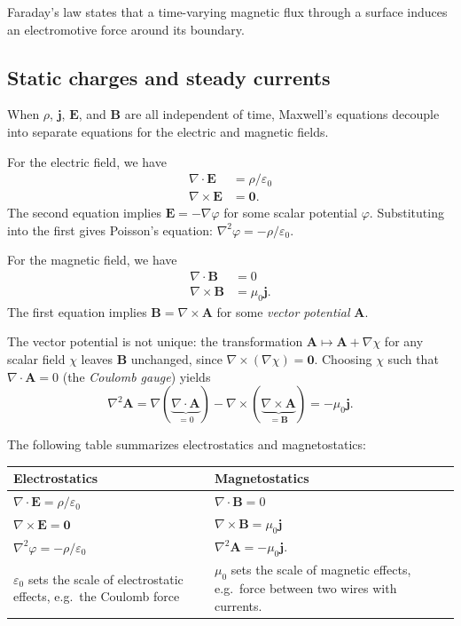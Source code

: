 \documentclass[a4paper]{article}
\begin{document}
\begin{rmk}
  Faraday's law states that a time-varying magnetic flux through a surface induces an electromotive force around its boundary.
\end{rmk}

\subsection{Static charges and steady currents}
When $\rho$, $\mathbf{j}$, $\mathbf{E}$, and $\mathbf{B}$ are all independent of time, Maxwell's equations decouple into separate equations for the electric and magnetic fields.

For the electric field, we have
\begin{align*}
  \nabla\cdot \mathbf{E} &= \rho/\varepsilon_0\\
  \nabla\times \mathbf{E} &= \mathbf{0}.
\end{align*}
The second equation implies $\mathbf{E} = -\nabla \varphi$ for some scalar potential $\varphi$. Substituting into the first gives Poisson's equation: $\nabla^2 \varphi = -\rho/\varepsilon_0$.

For the magnetic field, we have
\begin{align*}
  \nabla\cdot \mathbf{B} &= 0\\
  \nabla\times \mathbf{B} &= \mu_0 \mathbf{j}.
\end{align*}
The first equation implies $\mathbf{B} = \nabla \times \mathbf{A}$ for some \emph{vector potential} $\mathbf{A}$.

\begin{rmk}
  The vector potential is not unique: the transformation $\mathbf{A} \mapsto \mathbf{A} + \nabla \chi$ for any scalar field $\chi$ leaves $\mathbf{B}$ unchanged, since $\nabla\times(\nabla \chi) = \mathbf{0}$. Choosing $\chi$ such that $\nabla\cdot \mathbf{A} = 0$ (the \emph{Coulomb gauge}) yields
  \[
    \nabla^2 \mathbf{A} = \nabla(\underbrace{\nabla\cdot \mathbf{A}}_{=0}) - \nabla\times (\underbrace{\nabla\times \mathbf{A}}_{=\mathbf{B}}) = -\mu_0 \mathbf{j}.
  \]
\end{rmk}

The following table summarizes electrostatics and magnetostatics:
\begin{center}
  \begin{tabularx}{\textwidth}{XX}
    \toprule
    Electrostatics & Magnetostatics\\
    \midrule
    $\nabla\cdot \mathbf{E} = \rho/\varepsilon_0$ & $\nabla\cdot \mathbf{B} = 0$\\
    $\nabla\times \mathbf{E} = \mathbf{0}$ & $\nabla\times \mathbf{B} = \mu_0 \mathbf{j}$\\
    $\nabla^2 \varphi = -\rho/\varepsilon_0$ & $\nabla^2 \mathbf{A} = -\mu_0 \mathbf{j}$.\\
    $\varepsilon_0$ sets the scale of electrostatic effects, e.g.\ the Coulomb force & $\mu_0$ sets the scale of magnetic effects, e.g.\ force between two wires with currents.\\
    \bottomrule
  \end{tabularx}
\end{center}
\end{document}
